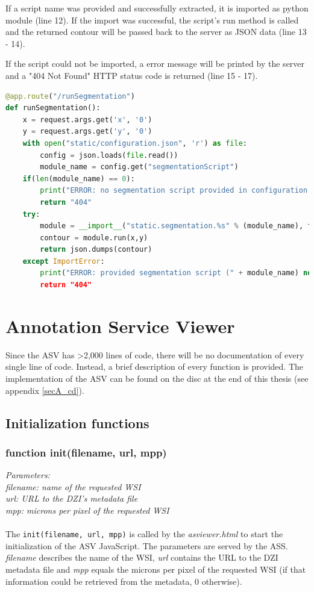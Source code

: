 If a script name was provided and successfully extracted, it is imported as python module (line 12). If the import was successful, the script's run method is called and the returned contour will be passed back to the server as JSON data (line 13 - 14).

If the script could not be imported, a error message will be printed by the server and a "404 Not Found" HTTP status code is returned (line 15 - 17).

\begin{lstlisting}[language=Python, frame=single]
@app.route("/runSegmentation")
def runSegmentation():
	x = request.args.get('x', '0')
	y = request.args.get('y', '0')
	with open("static/configuration.json", 'r') as file:
		config = json.loads(file.read())
		module_name = config.get("segmentationScript")
	if(len(module_name) == 0):
		print("ERROR: no segmentation script provided in configuration file (configuration.json)!")
		return "404"
	try:
		module = __import__("static.segmentation.%s" % (module_name), fromlist=["segmentation"])
		contour = module.run(x,y)
		return json.dumps(contour)
	except ImportError:
		print("ERROR: provided segmentation script (" + module_name) not found!")
		return "404"
\end{lstlisting}


\section{Annotation Service Viewer}
\label{sec_B2}
Since the ASV has \textgreater 2,000 lines of code, there will be no documentation of every single line of code. Instead, a brief description of every function is provided. The implementation of the ASV can be found on the disc at the end of this thesis (see appendix \ref{secA_cd}).


\subsection{Initialization functions}

\subsubsection{function init(file{\textunderscore}name, url, mpp)}
\emph{Parameters:\\
	file{\textunderscore}name: name of the requested WSI\\
	url: URL to the DZI's metadata file\\
	mpp: microns per pixel of the requested WSI\\ \\
}
The \texttt{init(file{\textunderscore}name, url, mpp)} is called by the \emph{as{\textunderscore}viewer.html} to start the initialization of the ASV JavaScript. The parameters are served by the ASS. \emph{file{\textunderscore}name} describes the name of the WSI, \emph{url} contains the URL to the DZI metadata file and \emph{mpp} equals the microns per pixel of the requested WSI (if that information could be retrieved from the metadata, 0 otherwise).

